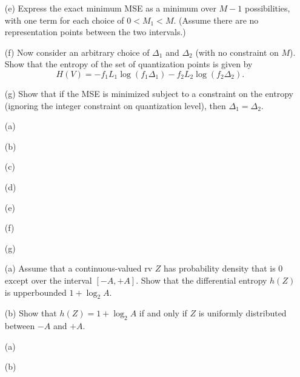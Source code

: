 \documentclass{assignment}
\begin{document}
\begin{prob}[3.4]
\begin{itemize}
        \item[(e)] Express the exact minimum MSE as a minimum over $M-1$ possibilities, with one term for each choice of $0<M_1<M$. (Assume there are no representation points between the two intervals.)
        \item[(f)] Now consider an arbitrary choice of $\Delta_1$ and $\Delta_2$ (with no constraint on $M$). Show that the entropy of the set of quantization points is given by
        \[
            H(V)=-f_1L_1\log(f_1\Delta_1)-f_2L_2\log(f_2\Delta_2).
        \]
        \item[(g)] Show that if the MSE is minimized subject to a constraint on the entropy (ignoring the integer constraint on quantization level), then $\Delta_1=\Delta_2$.
    \end{itemize}
\end{prob}
\begin{sol}
    \begin{itemize}
        \item[(a)] 
        \item[(b)] 
        \item[(c)] 
        \item[(d)] 
        \item[(e)] 
        \item[(f)] 
        \item[(g)] 
    \end{itemize}
\end{sol}

\begin{prob}[3.5]
    \begin{itemize}
        \item[(a)] Assume that a continuous-valued rv $Z$ has probability density that is $0$ except over the interval $[-A,+A]$. Show that the differential entropy $h(Z)$ is upperbounded $1+\log_2A$.
        \item[(b)] Show that $h(Z)=1+\log_2A$ if and only if $Z$ is uniformly distributed between $-A$ and $+A$.
    \end{itemize}
\end{prob}
\begin{sol}
    \begin{itemize}
        \item[(a)] 
        \item[(b)] 
    \end{itemize}
\end{sol}
\end{document}
